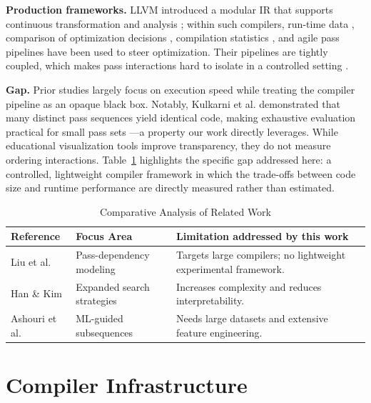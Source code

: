 \documentclass[conference,a4paper]{IEEEtran}
\begin{document}
\textbf{Production frameworks.} LLVM introduced a modular IR that supports continuous transformation and analysis \cite{ref16}; within such compilers, run-time data \cite{ref23}, comparison of optimization decisions \cite{ref24}, compilation statistics \cite{ref7}, and agile pass pipelines \cite{ref27} have been used to steer optimization. Their pipelines are tightly coupled, which makes pass interactions hard to isolate in a controlled setting \cite{ref16}.

\textbf{Gap.} Prior studies largely focus on execution speed while treating the compiler pipeline as an opaque black box. Notably, Kulkarni et al. demonstrated that many distinct pass sequences yield identical code, making exhaustive evaluation practical for small pass sets \cite{ref19}---a property our work directly leverages. While educational visualization tools \cite{ref30} improve transparency, they do not measure ordering interactions. Table~\ref{tab:lit_review} highlights the specific gap addressed here: a controlled, lightweight compiler framework in which the trade-offs between code size and runtime performance are directly measured rather than estimated.

\begin{table}[htbp]
\caption{Comparative Analysis of Related Work}
\label{tab:lit_review}
\centering
\renewcommand{\arraystretch}{1.1}
{\small
\begin{tabularx}{\columnwidth}{@{}p{} p{} X@{}}
\toprule
\textbf{Reference} & \textbf{Focus Area} & \textbf{Limitation addressed by this work} \\
\midrule
Liu et al. \cite{ref1} & Pass-dependency modeling & Targets large compilers; no lightweight experimental framework. \\
Han \& Kim \cite{ref2} & Expanded search strategies & Increases complexity and reduces interpretability. \\
Ashouri et al. \cite{ref15} & ML-guided subsequences & Needs large datasets and extensive feature engineering. \\
\bottomrule
\end{tabularx}
}
\end{table}

\section{Compiler Infrastructure}
\end{document}
